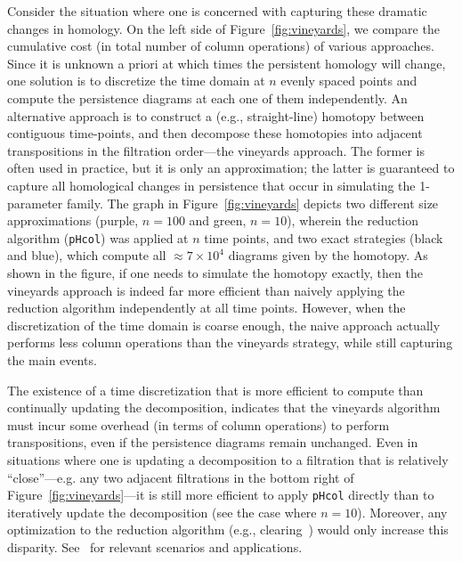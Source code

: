 \documentclass{article} %
\begin{document}
  Consider the situation where one is concerned with capturing these dramatic changes in homology.
  On the left side of Figure~\ref{fig:vineyards}, we compare the cumulative cost (in total number of column operations) of various approaches.
  Since it is unknown a priori at which times  the persistent homology will change, one solution is to discretize the time domain at $n$ evenly spaced points and compute the persistence diagrams at each one of them  independently. 
  An alternative approach is to construct a (e.g., straight-line) homotopy between  contiguous time-points, and then decompose these homotopies into adjacent transpositions in the filtration order---the vineyards approach. The former is often used in practice, but it is only an approximation; the latter is guaranteed to capture all homological changes in persistence that occur in simulating the 1-parameter family. 
  The graph in Figure~\ref{fig:vineyards} depicts two different size approximations (purple, $n=100$ and green, $n=10$), wherein the reduction algorithm (\texttt{pHcol}) was applied at $n$ time points, and two exact strategies (black and blue), which compute all $\approx 7 \times 10^{4}$ diagrams given by the homotopy. 
  As shown in the figure, if one needs to simulate the homotopy exactly, then the vineyards approach is indeed far more efficient than naively applying the reduction algorithm independently at all time points.
  However, when the discretization of the time domain is coarse enough, the naive approach actually performs less column operations than the vineyards strategy, while still capturing the main events. 
  
  The existence of a time discretization that is more efficient to compute than continually updating the decomposition, indicates that the vineyards algorithm must incur some overhead (in terms of column operations) to perform transpositions, even if the persistence diagrams remain unchanged. 
  Even in situations where one is updating a decomposition to a filtration that is  relatively ``close''---e.g. any two adjacent filtrations in the bottom right of Figure~\ref{fig:vineyards}---it is still more efficient to apply \texttt{pHcol} directly than  to iteratively update the decomposition (see the case where $n = 10$). 
 Moreover, any optimization to the reduction algorithm (e.g.,  clearing~\cite{chen2011persistent}) would only increase this disparity.
 See~\cite{topaz2015topological, xian2020capturing, lesnick2015interactive, kim2020spatiotemporal} 
 for relevant scenarios and applications. 
 
\end{document}

